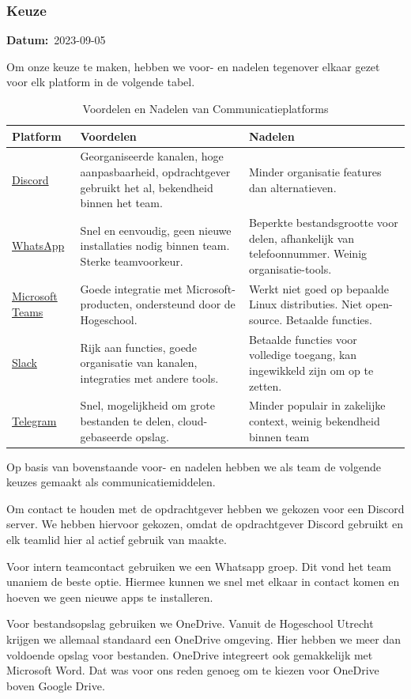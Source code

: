 \documentclass[a4paper]{report}
\newcommand{\timestamp}[1]{
  \mbox{\scriptsize \textbf{Datum:} #1} \smallbreak
}
\begin{document}
\subsubsection{Keuze}
\timestamp{2023-09-05}
Om onze keuze te maken, hebben we voor- en nadelen tegenover elkaar gezet voor elk platform in de volgende tabel.
\begin{table}[H]
  \centering
  \begin{tabular}{|l|p{6cm}|p{6cm}|}
    \hline
    \textbf{Platform} & \textbf{Voordelen} & \textbf{Nadelen} \\
    \hline
    \href{https://discord.com/}{Discord} & Georganiseerde kanalen, hoge aanpasbaarheid, opdrachtgever gebruikt het al, bekendheid binnen het team. & Minder organisatie features dan alternatieven. \\
    \hline
    \href{https://www.whatsapp.com/}{WhatsApp} & Snel en eenvoudig, geen nieuwe installaties nodig binnen team. Sterke teamvoorkeur. & Beperkte bestandsgrootte voor delen, afhankelijk van telefoonnummer. Weinig organisatie-tools. \\
    \hline
    \href{https://www.microsoft.com/en-us/microsoft-teams/group-chat-software}{Microsoft Teams} & Goede integratie met Microsoft-producten, ondersteund door de Hogeschool. & Werkt niet goed op bepaalde Linux distributies. Niet open-source. Betaalde functies. \\
    \hline
    \href{https://slack.com/}{Slack} & Rijk aan functies, goede organisatie van kanalen, integraties met andere tools. & Betaalde functies voor volledige toegang, kan ingewikkeld zijn om op te zetten. \\
    \hline
    \href{https://telegram.org/}{Telegram} & Snel, mogelijkheid om grote bestanden te delen, cloud-gebaseerde opslag. & Minder populair in zakelijke context, weinig bekendheid binnen team \\
    \hline
  \end{tabular}
  \caption{Voordelen en Nadelen van Communicatieplatforms}
  \label{tab:comm_pros_cons}
\end{table}

Op basis van bovenstaande voor- en nadelen hebben we als team de volgende keuzes gemaakt als communicatiemiddelen.
\par\smallskip
Om contact te houden met de opdrachtgever hebben we gekozen voor een Discord server.
We hebben hiervoor gekozen, omdat de opdrachtgever Discord gebruikt en elk teamlid hier al actief gebruik van maakte.
\par \smallskip 
Voor intern teamcontact gebruiken we een Whatsapp groep. Dit vond het team unaniem de beste optie. Hiermee kunnen we snel met elkaar in contact komen en hoeven we geen nieuwe apps te installeren. 
\par \smallskip
Voor bestandsopslag gebruiken we OneDrive. Vanuit de Hogeschool Utrecht krijgen we allemaal standaard een OneDrive omgeving.
Hier hebben we meer dan voldoende opslag voor bestanden. OneDrive integreert ook gemakkelijk met Microsoft Word. 
Dat was voor ons reden genoeg om te kiezen voor OneDrive boven Google Drive.
\end{document}
